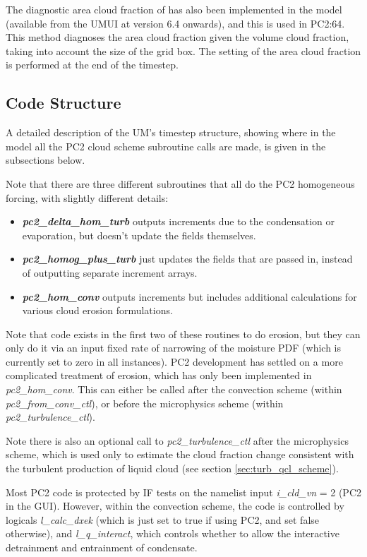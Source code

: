 \documentclass{UMDP_article}
\begin{document}
The diagnostic area cloud fraction of \cite{bhi05} 
has also been implemented in the model (available from the UMUI at version 6.4 onwards),
and this is used in PC2:64. This method diagnoses the area cloud fraction
given the volume cloud fraction, taking into account the size of the grid
box. The setting of the area cloud fraction is performed at the end of the timestep.

\subsection{Code Structure}
\label{sec:code}

A detailed description of the UM's timestep structure,
showing where in the model all the PC2 cloud scheme subroutine calls are made,
is given in the subsections below.

Note that there are three different subroutines that all do
the PC2 homogeneous forcing, with slightly different details:

\begin{itemize}
\item {\bf{\it pc2\_delta\_hom\_turb}} outputs increments due to the
condensation or evaporation, but doesn't update the fields themselves.
\item {\bf{\it pc2\_homog\_plus\_turb}} just updates the fields that
are passed in, instead of outputting separate increment arrays.
\item {\bf{\it pc2\_hom\_conv}} outputs increments but includes additional
calculations for various cloud erosion formulations.
\end{itemize}

Note that code exists in the first two of these routines to do erosion,
but they can only do it via an input fixed rate of narrowing of the
moisture PDF (which is currently set to zero in all instances).
PC2 development has settled on a more complicated treatment of erosion,
which has only been implemented in {\it pc2\_hom\_conv}.
This can either be called after the convection scheme
(within {\it pc2\_from\_conv\_ctl}),
or before the microphysics scheme (within {\it pc2\_turbulence\_ctl}).

Note there is also an optional call to {\it pc2\_turbulence\_ctl}
after the microphysics scheme, which is used only to estimate the
cloud fraction change consistent with the turbulent production of
liquid cloud (see section \ref{sec:turb_qcl_scheme}).

Most PC2 code is protected by IF tests on the namelist input
{\it i\_cld\_vn} = 2 (PC2 in the GUI).
However, within the convection scheme, the code is controlled by logicals
{\it l\_calc\_dxek} (which is just set to true if using PC2, and set false
otherwise), and {\it l\_q\_interact}, which controls
whether to allow the interactive detrainment and entrainment of condensate.
\end{document}
